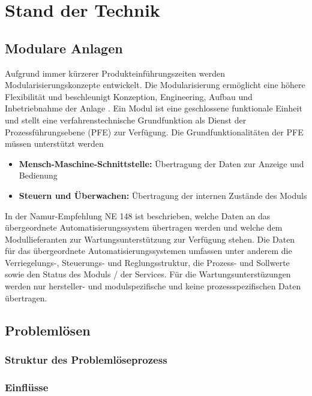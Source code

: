 
\chapter{Stand der Technik}
\label{sec:StandDerTechnik}


\section{Modulare Anlagen}
Aufgrund immer kürzerer Produkteinführungszeiten werden Modularisierungskonzepte entwickelt. Die Modularisierung ermöglicht eine höhere Flexibilität und beschleunigt Konzeption, Engineering, Aufbau und Inbetriebnahme der Anlage \cite{Urbas2012}. Ein Modul ist eine geschlossene funktionale Einheit und stellt eine verfahrenstechnische Grundfunktion als Dienst der Prozessführungsebene (PFE) zur Verfügung. Die Grundfunktionalitäten der PFE müssen unterstützt werden \cite{Bernshausen2016}
\begin{itemize}
\item \textbf{Mensch-Maschine-Schnittstelle:} Übertragung der Daten zur Anzeige und Bedienung
\item \textbf{Steuern und Überwachen:} Übertragung der internen Zustände des Moduls
\end{itemize}

In der Namur-Empfehlung NE 148 \cite{NAMURArbeitskreis1.122013} ist beschrieben, welche Daten an das übergeordnete Automatisierungssystem übertragen werden und welche dem Modullieferanten zur Wartungsunterstützung zur Verfügung stehen. Die Daten für das übergeordnete Automatisierungssystemen umfassen unter anderem die Verriegelungs-, Steuerungs- und Reglungsstruktur, die Prozess- und Sollwerte sowie den Status des Moduls / der Services. Für die Wartungsunterstüzungen werden nur hersteller- und modulspezifische und keine prozessspezifischen Daten übertragen.


\section{Problemlösen}

\subsection{Struktur des Problemlöseprozess}

\subsection{Einflüsse}


